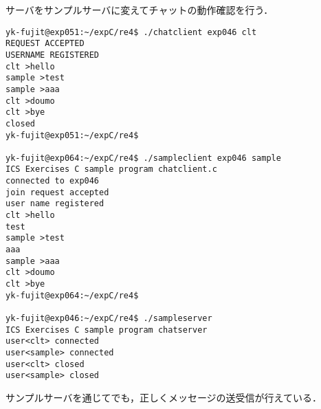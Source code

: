 \documentclass[a4j,10pt,titlepage]{jsarticle}
\begin{document}
サーバをサンプルサーバに変えてチャットの動作確認を行う．
\begin{verbatim}
yk-fujit@exp051:~/expC/re4$ ./chatclient exp046 clt
REQUEST ACCEPTED
USERNAME REGISTERED
clt >hello
sample >test
sample >aaa
clt >doumo
clt >bye
closed
yk-fujit@exp051:~/expC/re4$ 

yk-fujit@exp064:~/expC/re4$ ./sampleclient exp046 sample
ICS Exercises C sample program chatclient.c
connected to exp046
join request accepted
user name registered
clt >hello
test
sample >test
aaa
sample >aaa
clt >doumo
clt >bye
yk-fujit@exp064:~/expC/re4$

yk-fujit@exp046:~/expC/re4$ ./sampleserver 
ICS Exercises C sample program chatserver
user<clt> connected
user<sample> connected
user<clt> closed
user<sample> closed
\end{verbatim}
サンプルサーバを通じてでも，正しくメッセージの送受信が行えている．
\end{document}
